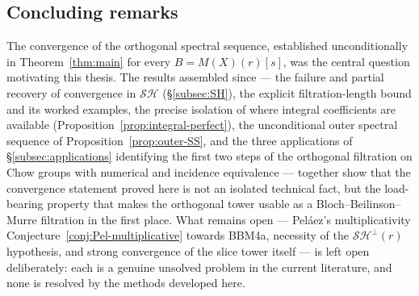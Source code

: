 \documentclass[12pt,a4paper]{article}
\theoremstyle{definition}
\newcommand{\SH}{\mathcal{SH}}
\begin{document}
\subsection*{Concluding remarks}

The convergence of the orthogonal spectral sequence, established
unconditionally in Theorem~\ref{thm:main} for every $B=M(X)(r)[s]$, was the
central question motivating this thesis.  The results assembled since —
the failure and partial recovery of convergence in $\SH$
(\S\ref{subsec:SH}), the explicit filtration-length bound and its
worked examples, the precise isolation of where integral coefficients are
available (Proposition~\ref{prop:integral-perfect}), the unconditional
outer spectral sequence of Proposition~\ref{prop:outer-SS}, and the three
applications of \S\ref{subsec:applications} identifying the first two steps
of the orthogonal filtration on Chow groups with numerical and incidence
equivalence — together show that the convergence statement proved here is
not an isolated technical fact, but the load-bearing property that makes
the orthogonal tower usable as a Bloch--Beilinson--Murre filtration in the
first place.  What remains open — Peláez's multiplicativity
Conjecture~\ref{conj:Pel-multiplicative} towards BBM4a, necessity of the
$\SH^\perp(r)$ hypothesis, and strong convergence of the slice tower itself
— is left open deliberately: each is a genuine unsolved problem in the
current literature, and none is resolved by the methods developed here.
\end{document}
